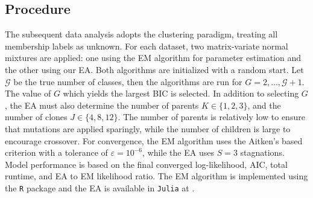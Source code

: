 \documentclass[12pt, centerh1]{article}
\begin{document}
\subsection{Procedure}
The subsequent data analysis adopts the clustering paradigm, treating all membership labels as unknown. For each dataset, two matrix-variate normal mixtures are applied: one using the EM algorithm for parameter estimation and the other using our EA. Both algorithms are initialized with a random start. Let $\mathcal{G}$ be the true number of classes, then the algorithms are run for $G=2,\dots, \mathcal{G} + 1$. The value of $G$ which yields the largest BIC is selected. In addition to selecting $G$, the EA must also determine the number of parents $K \in \{1, 2, 3\}$, and the number of clones $J \in \{4, 8, 12\}$. The number of parents is relatively low to ensure that mutations are applied sparingly, while the number of children is large to encourage crossover. For convergence, the EM algorithm uses the Aitken's based criterion with a tolerance of $\varepsilon =10^{-6}$, while the EA uses $S=3$ stagnations. Model performance is based on the final converged log-likelihood, AIC, total runtime, and EA to EM likelihood ratio. The EM algorithm is implemented using the \texttt{R} package \citet{matrixmixtures} and the EA is available in \texttt{Julia} at \citet{flynn2023} \citep{R, Julia}.
\end{document}
